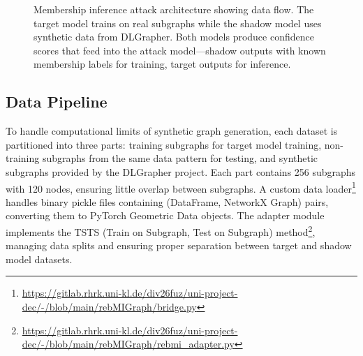 \documentclass{article}
\begin{document}
\begin{figure}[H]
\caption{Membership inference attack architecture showing data flow. The target model trains on real subgraphs while the shadow model uses synthetic data from DLGrapher. Both models produce confidence scores that feed into the attack model—shadow outputs with known membership labels for training, target outputs for inference.}
\label{fig:attack-architecture}
\end{figure}

\subsection{Data Pipeline}
To handle computational limits of synthetic graph generation, each dataset is partitioned into three parts: training subgraphs for target model training, non-training subgraphs from the same data pattern for testing, and synthetic subgraphs provided by the DLGrapher project. Each part contains 256 subgraphs with 120 nodes, ensuring little overlap between subgraphs. A custom data loader\footnote{\url{https://gitlab.rhrk.uni-kl.de/div26fuz/uni-project-dec/-/blob/main/rebMIGraph/bridge.py}} handles binary pickle files containing (DataFrame, NetworkX Graph) pairs, converting them to PyTorch Geometric Data objects. The adapter module implements the TSTS (Train on Subgraph, Test on Subgraph) method\footnote{\url{https://gitlab.rhrk.uni-kl.de/div26fuz/uni-project-dec/-/blob/main/rebMIGraph/rebmi_adapter.py}}, managing data splits and ensuring proper separation between target and shadow model datasets.
\end{document}
